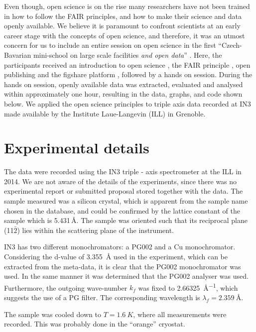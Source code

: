 \documentclass[aps,pra,reprint,amsmath,amssymb,superscriptaddress,showkeys]{revtex4-1}
\begin{document}
Even though, open science is on the rise many researchers have not been trained in how to follow the FAIR principles, and how to make their science and data openly available.
We believe it is paramount to confront scientists at an early career stage with the concepts of open science, and therefore, it was an utmost concern for us to include an entire session on open science in the first ``Czech-Bavarian mini-school on large scale facilities \emph{and open data}'' \cite{mini-school}.
Here, the participants received an introduction to open science \cite{foster}, the FAIR principle \cite{FAIR}, open publishing \cite{arXiv} and the figshare platform \cite{figshare}, followed by a hands on session.
During the hands on session, openly available data was extracted, evaluated and analysed within approximately one hour, resulting in the data, graphs, and code \cite{data-evaluation, data-docker} shown below.
We applied the open science principles to triple axis data recorded at IN3 \cite{data} made available by the Institute Laue-Langevin (ILL) in Grenoble.

\section{Experimental details}

The data were recorded using the IN3 triple - axis spectrometer \cite{IN3} at the ILL in 2014.
We are not aware of the details of the experiments, since there was no experimental report or submitted proposal stored together with the data.
The sample measured was a silicon crystal, which is apparent from the sample name chosen in the database, and could be confirmed by the lattice constant of the sample which is 5.431\,\AA \cite{Hom1975}. The sample was oriented such that its reciprocal plane (11$\bar{2}$) lies within the scattering plane of the instrument.

IN3 has two different monochromators: a PG002 and a Cu monochromator.
Considering the d-value of \SI{3.355}{\mbox{\AA}} used in the experiment, which can be extracted from the meta-data, it is clear that the PG002 monochromator was used.
In the same manner it was determined that the PG002 analyser was used. 
Furthermore, the outgoing wave-number $k_f$ was fixed to \SI{2.66325}{\mbox{\AA}^{-1}}, which suggests the use of a PG filter. 
The corresponding wavelength is $\lambda_f=\SI{2.359}{\mbox{\AA}}$.

The sample was cooled down to $T = \SI{1.6}{K}$, where all measurements were recorded. 
This was probably done in the ``orange'' cryostat.
\end{document}

